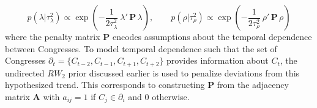 {\singlespacing
$$ 
p(\lambda | \tau_\lambda^2) \propto \exp{\left(-\frac{1}{2\tau_\lambda^2} \: \lambda' \, \mathbf{P}  \, \lambda \right)}, 
\qquad
p(\rho | \tau_\rho^2) \propto \exp{\left(-\frac{1}{2\tau_\rho^2} \: \rho' \, \mathbf{P} \, \rho \right)}
 $$
}
%
\noindent where the penalty matrix $\mathbf{P}$ encodes assumptions about the temporal dependence between Congresses. %
To model temporal dependence such that the set of Congresses $\partial_t = \{C_{t-2}, C_{t-1}, C_{t+1}, C_{t + 2} \}$ provides information about $C_t$, the undirected $RW_2$ prior discussed earlier is used to penalize deviations from this hypothesized trend. This corresponds to constructing $\mathbf{P}$ from the adjacency matrix $\mathbf{A}$ with $a_{ij} = 1$ if $C_j \in \partial_i$ and 0 otherwise.


